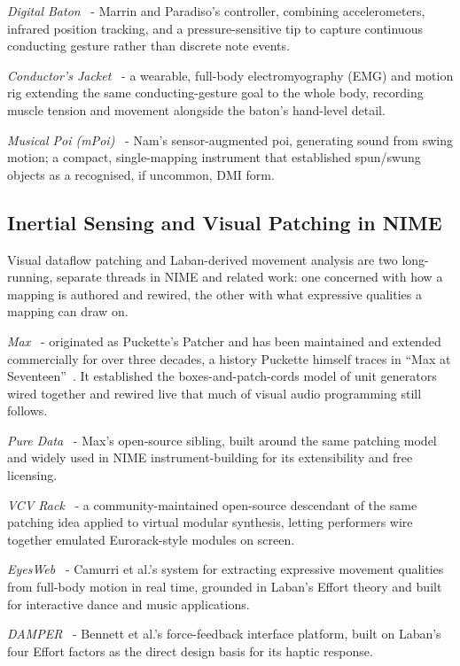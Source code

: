 \documentclass[sigconf,nonacm]{acmart}
\begin{document}
\textit{Digital Baton}~\cite{marrin1997digitalbaton} - Marrin and Paradiso's controller, combining
accelerometers, infrared position tracking, and a pressure-sensitive tip to capture continuous
conducting gesture rather than discrete note events.

\textit{Conductor's Jacket}~\cite{marrin1998conductorsjacket} - a wearable, full-body
electromyography (EMG) and motion rig extending the same conducting-gesture goal to the whole body,
recording muscle tension and movement alongside the baton's hand-level detail.

\textit{Musical Poi (mPoi)}~\cite{nam2013mpoi} - Nam's sensor-augmented poi, generating sound from
swing motion; a compact, single-mapping instrument that established spun/swung objects as a
recognised, if uncommon, DMI form.

\subsection{Inertial Sensing and Visual Patching in NIME}
Visual dataflow patching and Laban-derived movement analysis are two long-running, separate
threads in NIME and related work: one concerned with how a mapping is authored and rewired, the
other with what expressive qualities a mapping can draw on.

\textit{Max}~\cite{puckette1988patcher} - originated as Puckette's Patcher and has been maintained
and extended commercially for over three decades, a history Puckette himself traces in
``Max at Seventeen''~\cite{puckette2002maxatseventeen}. It established the boxes-and-patch-cords
model of unit generators wired together and rewired live that much of visual audio programming
still follows.

\textit{Pure Data}~\cite{puckette1996puredata} - Max's open-source sibling, built around the same
patching model and widely used in NIME instrument-building for its extensibility and free
licensing.

\textit{VCV Rack}~\cite{belt2017vcvrack} - a community-maintained open-source descendant of the same
patching idea applied to virtual modular synthesis, letting performers wire together emulated
Eurorack-style modules on screen.

\textit{EyesWeb}~\cite{camurri2000eyesweb} - Camurri et al.'s system for extracting expressive
movement qualities from full-body motion in real time, grounded in Laban's Effort theory and built
for interactive dance and music applications.

\textit{DAMPER}~\cite{bennett2007damper} - Bennett et al.'s force-feedback interface platform, built
on Laban's four Effort factors as the direct design basis for its haptic response.
\end{document}
